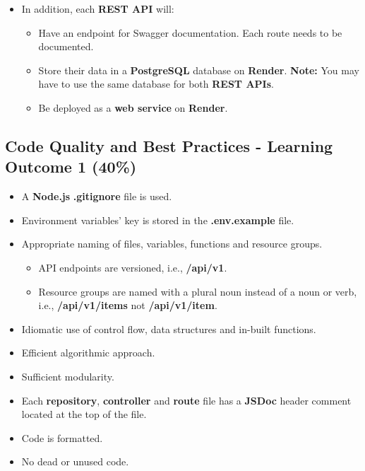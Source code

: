 \documentclass{article}
\begin{document}
\begin{itemize}
\begin{itemize}
	\end{itemize}
	\item In addition, each \textbf{REST API} will:
	\begin{itemize}
		\item Have an endpoint for Swagger documentation. Each route needs to be documented. 
		\item Store their data in a \textbf{PostgreSQL} database on \textbf{Render}. \textbf{Note:} You may have to use the same database for both \textbf{REST APIs}.
		\item Be deployed as a \textbf{web service} on \textbf{Render}.
	\end{itemize} 
\end{itemize}

\subsection*{Code Quality and Best Practices - Learning Outcome 1 (40\%)}
\begin{itemize}
	\item A \textbf{Node.js} \textbf{.gitignore} file is used.
	\item Environment variables' key is stored in the \textbf{.env.example} file. 
  	\item Appropriate naming of files, variables, functions and resource groups.
  	\begin{itemize}
		\item API endpoints are versioned, i.e., \textbf{/api/v1}.
		\item Resource groups are named with a plural noun instead of a noun or verb, i.e., \textbf{/api/v1/items} not \textbf{/api/v1/item}.
  	\end{itemize}
	\item Idiomatic use of control flow, data structures and in-built functions.
	\item Efficient algorithmic approach.
	\item Sufficient modularity.
	\item Each \textbf{repository}, \textbf{controller} and \textbf{route} file has a \textbf{JSDoc} header comment located at the top of the file.
	\item Code is formatted.
	\item No dead or unused code. 
\end{itemize}
\end{document}

